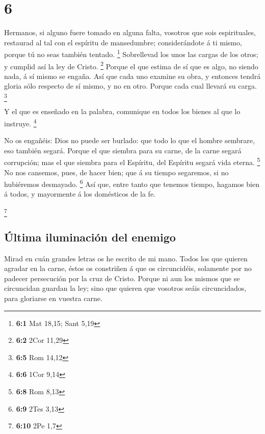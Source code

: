 \hypertarget{section-5}{%
\section{6}\label{section-5}}

 Hermanos, si alguno fuere tomado en alguna falta,
vosotros que sois espirituales, restaurad al tal con el espíritu de
mansedumbre; considerándote á ti mismo, porque tú no seas también
tentado. \footnote{\textbf{6:1} Mat 18,15; Sant 5,19} 
Sobrellevad los unos las cargas de los otros; y cumplid así la ley de
Cristo. \footnote{\textbf{6:2} 2Cor 11,29}  Porque el que
estima de sí que es algo, no siendo nada, á sí mismo se engaña.
 Así que cada uno examine su obra, y entonces tendrá
gloria sólo respecto de sí mismo, y no en otro.  Porque
cada cual llevará su carga. \footnote{\textbf{6:5} Rom 14,12}

 Y el que es enseñado en la palabra, comunique en todos
los bienes al que lo instruye. \footnote{\textbf{6:6} 1Cor 9,14}

 No os engañéis: Dios no puede ser burlado: que todo lo
que el hombre sembrare, eso también segará.  Porque el que
siembra para su carne, de la carne segará corrupción; mas el que siembra
para el Espíritu, del Espíritu segará vida eterna. \footnote{\textbf{6:8}
  Rom 8,13}  No nos cansemos, pues, de hacer bien; que á
su tiempo segaremos, si no hubiéremos desmayado. \footnote{\textbf{6:9}
  2Tes 3,13}  Así que, entre tanto que tenemos tiempo,
hagamos bien á todos, y mayormente á los domésticos de la fe.

\footnote{\textbf{6:10} 2Pe 1,7}

\hypertarget{uxfaltima-iluminaciuxf3n-del-enemigo}{%
\subsection{Última iluminación del
enemigo}\label{uxfaltima-iluminaciuxf3n-del-enemigo}}

 Mirad en cuán grandes letras os he escrito de mi mano.
 Todos los que quieren agradar en la carne, éstos os
constriñen á que os circuncidéis, solamente por no padecer persecución
por la cruz de Cristo.  Porque ni aun los mismos que se
circuncidan guardan la ley; sino que quieren que vosotros seáis
circuncidados, para gloriarse en vuestra carne.

